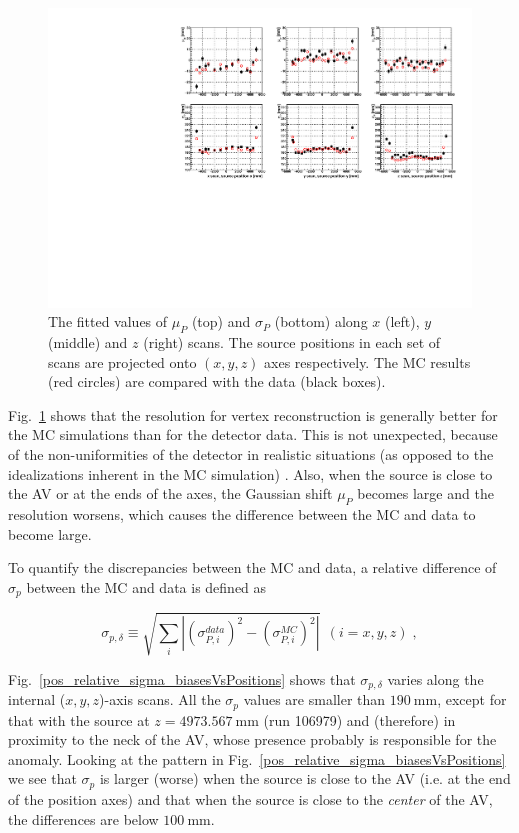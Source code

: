 \begin{figure}
	\centering
	\includegraphics[width=16cm]{N16_rat6176_muPandSigmaP_xyzScans.pdf}
	\caption[The fitted values of $\mu_P$ and $\sigma_P$ along $x$, $y$ and $z$-scans.]{The fitted values of $\mu_P$ (top) and $\sigma_P$ (bottom) along $x$ (left), $y$ (middle) and $z$ (right) scans. The source positions in each set of scans are projected onto $(x, y, z)$ axes respectively. The MC results (red circles) are compared with the data (black boxes).	\label{MPWscanXYZResols}}
\end{figure}

Fig.~\ref{MPWscanXYZResols} shows that the resolution for vertex reconstruction is generally better for the MC simulations than for the detector data. This is not unexpected, because of the non-uniformities of the detector in realistic situations (as opposed to the idealizations inherent in the MC simulation) \cite{waterunidoc}. Also, when the source is close to the AV or at the ends of the axes, the Gaussian shift $\mu_P$ becomes large and the resolution worsens, which causes the difference between the MC and data to become large.

To quantify the discrepancies between the MC and data, a relative difference of $\sigma_p$ between the MC and data is defined as \cite{waterunidoc}

\begin{equation}
\sigma_{p,\delta}\equiv\sqrt{\sum_i|(\sigma^{data}_{P,i})^2-(\sigma^{MC}_{P,i})^2|}~~(i=x,y,z)\; ,
\end{equation}

Fig.~\ref{pos_relative_sigma_biasesVsPositions} shows that $\sigma_{p,\delta}$ varies along the internal ($x, y, z$)-axis scans. All the $\sigma_p$ values are smaller than $190~$mm, except for that with the source at $z=4973.567~$mm (run 106979) and (therefore) in proximity to the neck of the AV, whose presence probably is responsible for the anomaly. Looking at the pattern in Fig.~\ref{pos_relative_sigma_biasesVsPositions} we see that $\sigma_p$ is larger (worse) when the source is close to the AV (i.e. at the end of the position axes) and that when the source is close to the {\em center} of the AV, the differences are below $100~$mm.

